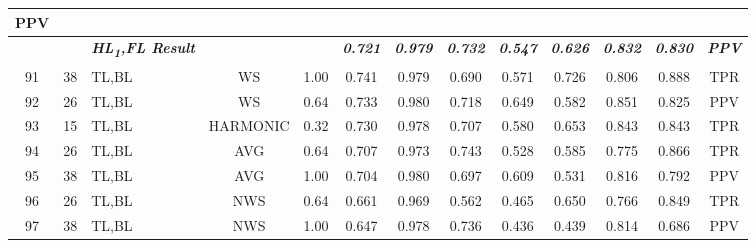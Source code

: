 \begin{table}[H]
{\begin{tabular}{cc|l|cc|c|c|c|c|c|c|c|c|}
    PPV \\ \hline
   &
    \textit{\textbf{}} &
    \textit{\textbf{HL\textsubscript{1},FL Result}} &
     &
     &
    \textit{\textbf{0.721}} &
    \textit{\textbf{0.979}} &
    \textit{\textbf{0.732}} &
    \textit{\textbf{0.547}} &
    \textit{\textbf{0.626}} &
    \textit{\textbf{0.832}} &
    \textit{\textbf{0.830}} &
    \textit{\textbf{PPV}} \\ \hline
  \multicolumn{1}{|c|}{91} &
    38 &
    TL,BL &
    \multicolumn{1}{c|}{WS} &
    1.00 &
    0.741 &
    0.979 &
    0.690 &
    0.571 &
    0.726 &
    0.806 &
    0.888 &
    TPR \\ \hline
  \multicolumn{1}{|c|}{92} &
    26 &
    TL,BL &
    \multicolumn{1}{c|}{WS} &
    0.64 &
    0.733 &
    0.980 &
    0.718 &
    0.649 &
    0.582 &
    0.851 &
    0.825 &
    PPV \\ \hline
  \multicolumn{1}{|c|}{93} &
    15 &
    TL,BL &
    \multicolumn{1}{c|}{HARMONIC} &
    0.32 &
    0.730 &
    0.978 &
    0.707 &
    0.580 &
    0.653 &
    0.843 &
    0.843 &
    TPR \\ \hline
  \multicolumn{1}{|c|}{94} &
    26 &
    TL,BL &
    \multicolumn{1}{c|}{AVG} &
    0.64 &
    0.707 &
    0.973 &
    0.743 &
    0.528 &
    0.585 &
    0.775 &
    0.866 &
    TPR \\ \hline
  \multicolumn{1}{|c|}{95} &
    38 &
    TL,BL &
    \multicolumn{1}{c|}{AVG} &
    1.00 &
    0.704 &
    0.980 &
    0.697 &
    0.609 &
    0.531 &
    0.816 &
    0.792 &
    PPV \\ \hline
  \multicolumn{1}{|c|}{96} &
    26 &
    TL,BL &
    \multicolumn{1}{c|}{NWS} &
    0.64 &
    0.661 &
    0.969 &
    0.562 &
    0.465 &
    0.650 &
    0.766 &
    0.849 &
    TPR \\ \hline
  \multicolumn{1}{|c|}{97} &
    38 &
    TL,BL &
    \multicolumn{1}{c|}{NWS} &
    1.00 &
    0.647 &
    0.978 &
    0.736 &
    0.436 &
    0.439 &
    0.814 &
    0.686 &
    PPV \\ \hline  
  \end{tabular}%
  }
  \end{table}



